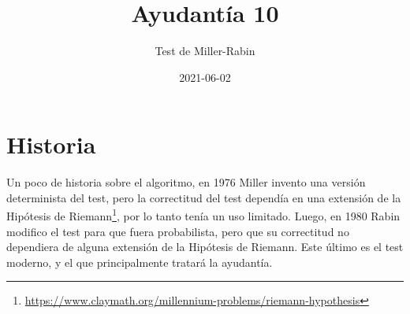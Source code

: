 \documentclass{ayudantia}
\title{Ayudantía 10}
\subtitle{Test de Miller-Rabin}
\date{2021-06-02}
\begin{document}
\maketitle
\section*{Historia}
Un poco de historia sobre el algoritmo, en 1976 Miller invento una versión determinista del test, pero la correctitud del test dependía en una extensión de la Hipótesis de Riemann\footnote{\url{https://www.claymath.org/millennium-problems/riemann-hypothesis}}, por lo tanto tenía un uso limitado. Luego, en 1980 Rabin modifico el test para que fuera probabilista, pero que su correctitud no dependiera de alguna extensión de la Hipótesis de Riemann. Este último es el test moderno, y el que principalmente tratará la ayudantía.
\end{document}
